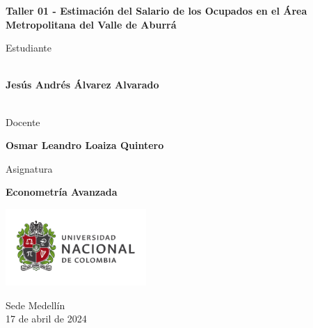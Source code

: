 \begin{titlepage}
   \Large{
   \begin{center}
       \vspace*{1cm}

       \textbf{Taller 01 - Estimación del Salario de los Ocupados en el Área Metropolitana del Valle de Aburrá}

            
       \vspace{1.5cm}
       
       Estudiante
       
       \vspace{0.5cm}
        
	\textbf{}\\    

	\textbf{Jesús Andrés Álvarez Alvarado}\\

	\textbf{}\\

              \vspace{1cm}
       
       Docente
       
       \vspace{0.5cm}

       \textbf{Osmar Leandro Loaiza Quintero}
       
       \vspace{0.4cm}

       \vspace{1.4cm}
       
       Asignatura
       
       \vspace{0.5cm}

       \textbf{Econometría Avanzada}

       \vfill

            
       \vspace{0.4cm}
     
       \includegraphics[width=0.4\textwidth]{logounal.png}
            
       Sede Medellín\\
       17 de abril de 2024
       
   \end{center}
   }
\end{titlepage}